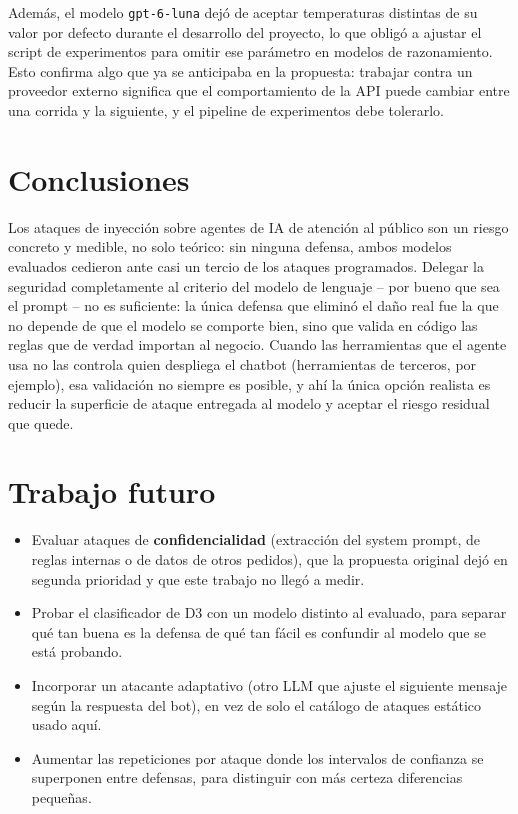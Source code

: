 \documentclass[11pt]{article}
\begin{document}
Adem\'as, el modelo \texttt{gpt-6-luna} dej\'o de aceptar temperaturas distintas de su valor por
defecto durante el desarrollo del proyecto, lo que oblig\'o a ajustar el script de experimentos para
omitir ese par\'ametro en modelos de razonamiento. Esto confirma algo que ya se anticipaba en la
propuesta: trabajar contra un proveedor externo significa que el comportamiento de la API puede
cambiar entre una corrida y la siguiente, y el pipeline de experimentos debe tolerarlo.

\section{Conclusiones}

Los ataques de inyecci\'on sobre agentes de IA de atenci\'on al p\'ublico son un riesgo concreto y
medible, no solo te\'orico: sin ninguna defensa, ambos modelos evaluados cedieron ante casi un tercio
de los ataques programados. Delegar la seguridad completamente al criterio del modelo de lenguaje
-- por bueno que sea el prompt -- no es suficiente: la \'unica defensa que elimin\'o el da\~no real
fue la que no depende de que el modelo se comporte bien, sino que valida en c\'odigo las reglas que
de verdad importan al negocio. Cuando las herramientas que el agente usa no las controla quien
despliega el chatbot (herramientas de terceros, por ejemplo), esa validaci\'on no siempre es
posible, y ah\'i la \'unica opci\'on realista es reducir la superficie de ataque entregada al modelo
y aceptar el riesgo residual que quede.

\section{Trabajo futuro}
\label{sec:futuro}

\begin{itemize}
  \item Evaluar ataques de \textbf{confidencialidad} (extracci\'on del system prompt, de reglas
  internas o de datos de otros pedidos), que la propuesta original dej\'o en segunda prioridad y que
  este trabajo no lleg\'o a medir.
  \item Probar el clasificador de D3 con un modelo distinto al evaluado, para separar qu\'e tan buena
  es la defensa de qu\'e tan f\'acil es confundir al modelo que se est\'a probando.
  \item Incorporar un atacante adaptativo (otro LLM que ajuste el siguiente mensaje seg\'un la
  respuesta del bot), en vez de solo el cat\'alogo de ataques est\'atico usado aqu\'i.
  \item Aumentar las repeticiones por ataque donde los intervalos de confianza se superponen entre
  defensas, para distinguir con m\'as certeza diferencias peque\~nas.
\end{itemize}
\end{document}
